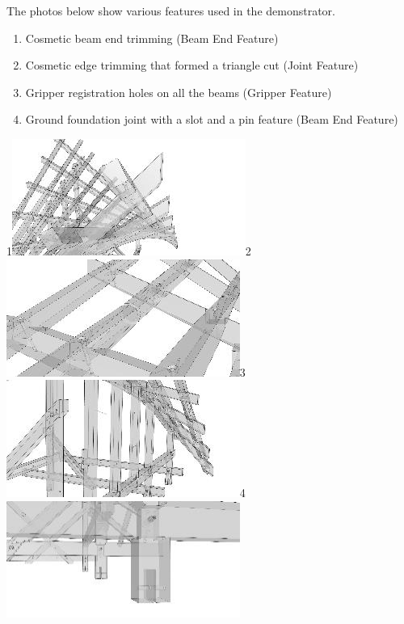 \documentclass[11pt]{book}
\begin{document}
The photos below show various features used in the demonstrator. 

\begin{enumerate}
	\item Cosmetic beam end trimming (Beam End Feature)

	\item Cosmetic edge trimming that formed a triangle cut  (Joint Feature)

	\item Gripper registration holes on all the beams (Gripper Feature)

	\item Ground foundation joint with a slot and a pin feature (Beam End Feature)

\end{enumerate}
{\footnotesize 1\includegraphics[width=7.64cm,height=3.82cm]{./images/image1.jpeg}2\includegraphics[width=7.64cm,height=3.83cm]{./images/image2.jpeg}3\includegraphics[width=7.64cm,height=3.83cm]{./images/image3.jpeg}4\includegraphics[width=7.64cm,height=3.83cm]{./images/image4.jpeg}}
\end{document}
